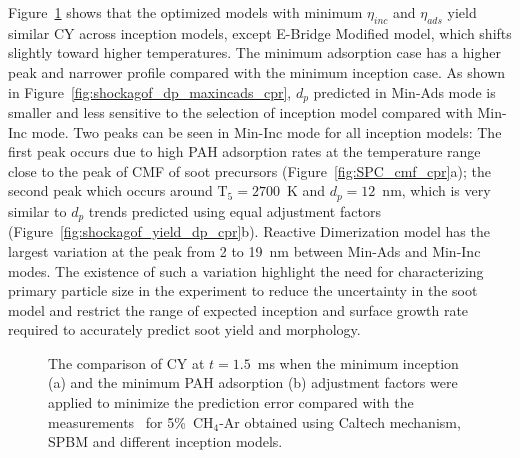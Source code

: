 Figure~\ref{fig:shockagof_yield_maxincads_cpr} shows that the optimized models with minimum $\eta_{inc}$ and $\eta_{ads}$ yield similar CY across inception models, except E-Bridge Modified model, which shifts slightly toward higher temperatures. The minimum adsorption case has a higher peak and narrower profile compared with the minimum inception case. As shown in Figure~\ref{fig:shockagof_dp_maxincads_cpr}, $d_p$ predicted in Min-Ads mode is smaller and less sensitive to the selection of inception model compared with Min-Inc mode. Two peaks can be seen in Min-Inc mode for all inception models: The first peak occurs due to high PAH adsorption rates at the temperature range close to the peak of CMF of soot precursors (Figure~\ref{fig:SPC_cmf_cpr}a); the second peak which occurs around $\mathrm{T_5}=2700$~K and $d_p=12$~nm, which is very similar to $d_p$ trends predicted using equal adjustment factors (Figure~\ref{fig:shockagof_yield_dp_cpr}b). Reactive Dimerization model has the largest variation at the peak from 2 to 19~nm between Min-Ads and Min-Inc modes. The existence of such a variation highlight the need for characterizing primary particle size in the experiment to reduce the uncertainty in the soot model and restrict the range of expected inception and surface growth rate required to accurately predict soot yield and morphology.

\begin{figure}[H]
	\centering
	\caption{The comparison of CY at $t=1.5$~ms when the minimum inception (a) and the minimum PAH adsorption (b) adjustment factors were applied to minimize the prediction error compared with the measurements~\citep{agafonov2016unified} for 5\%~$\mathrm{CH_4}$-Ar obtained using Caltech mechanism, SPBM and different inception models.}
	\label{fig:shockagof_yield_maxincads_cpr} 
\end{figure}

